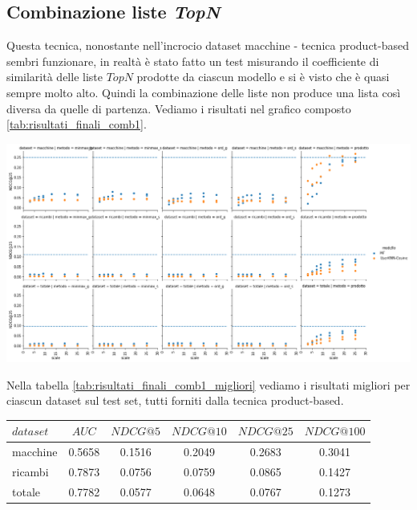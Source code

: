 \subsection{Combinazione liste \textit{TopN}}
Questa tecnica, nonostante nell'incrocio dataset macchine - tecnica product-based sembri funzionare, in realtà è stato fatto un test misurando il coefficiente di similarità delle liste $TopN$ prodotte da ciascun modello e si è visto che è quasi sempre molto alto. Quindi la combinazione delle liste non produce una lista così diversa da quelle di partenza. Vediamo i risultati nel grafico composto \ref{tab:risultati_finali_comb1}.
\begin{center}
\includegraphics[width=16cm]{figures/comb_1.png}
\label{tab:risultati_finali_comb1}
\end{center}
Nella tabella \ref{tab:risultati_finali_comb1_migliori} vediamo i risultati migliori per ciascun dataset sul test set, tutti forniti dalla tecnica product-based.
\begin{center}
    \begin{tabular}{|l|ccccc|}
        \toprule
        $dataset$ & $AUC$ & $NDCG@5$ & $NDCG@10$  & $NDCG@25$ & $NDCG@100$  \\
        \midrule
        macchine & 0.5658   &0.1516 & 0.2049 & 0.2683 & 0.3041 \\
        ricambi &  0.7873  &0.0756 & 0.0759 & 0.0865 & 0.1427 \\
        totale  & 0.7782   &0.0577 & 0.0648 & 0.0767 & 0.1273 \\
    \bottomrule
    \end{tabular}
\label{tab:risultati_finali_comb1_migliori}
\end{center}

